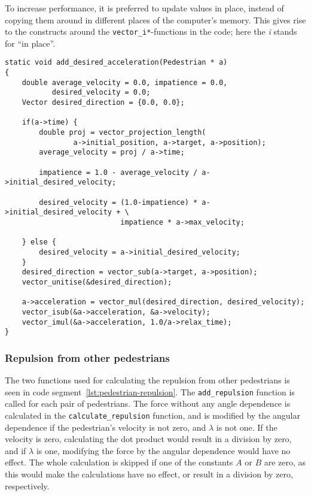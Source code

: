 To increase performance, it is preferred to update values in place, instead of 
copying them around in different places of the computer's memory. This gives 
rise to the constructs around the \texttt{vector\_i*}-functions in the code; 
here the \emph{i} stands for ``in place''.

\begin{lstlisting}[caption={Calculating the desired 
    force.},label=lst:desired-force]
static void add_desired_acceleration(Pedestrian * a)
{
    double average_velocity = 0.0, impatience = 0.0, 
           desired_velocity = 0.0;
    Vector desired_direction = {0.0, 0.0};

    if(a->time) {
        double proj = vector_projection_length(
                a->initial_position, a->target, a->position);
        average_velocity = proj / a->time;

        impatience = 1.0 - average_velocity / a->initial_desired_velocity;

        desired_velocity = (1.0-impatience) * a->initial_desired_velocity + \
                           impatience * a->max_velocity;

    } else {
        desired_velocity = a->initial_desired_velocity;
    }
    desired_direction = vector_sub(a->target, a->position);
    vector_unitise(&desired_direction);

    a->acceleration = vector_mul(desired_direction, desired_velocity);
    vector_isub(&a->acceleration, &a->velocity);
    vector_imul(&a->acceleration, 1.0/a->relax_time);
}
\end{lstlisting}

\subsubsection{Repulsion from other pedestrians}
The two functions used for calculating the repulsion from other pedestrians is seen 
in code segment~\ref{lst:pedestrian-repulsion}. The \texttt{add\_repulsion} function 
is called for each pair of pedestrians. The force without any angle dependence is 
calculated in the \texttt{calculate\_repulsion} function, and is modified by 
the angular dependence if the pedestrian's velocity is not zero, and $\lambda$ is 
not one. If the velocity is zero, calculating the dot product would result in 
a division by zero, and if $\lambda$ is one, modifying the force by the 
angular dependence would have no effect. The whole calculation is skipped if 
one of the constants $A$ or $B$ are zero, as this would make the calculations 
have no effect, or result in a division by zero, respectively.

